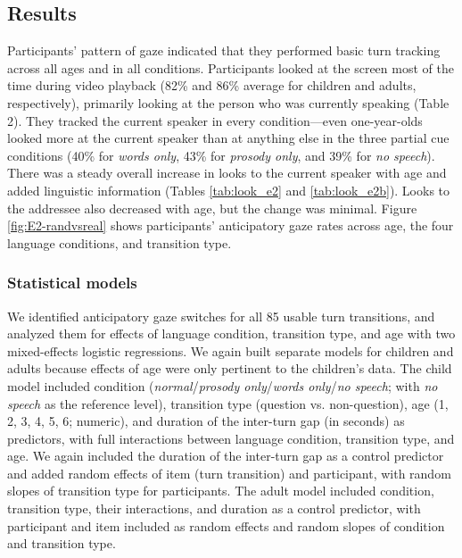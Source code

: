 \documentclass[authoryear, 12pt]{elsarticle}
\begin{document}
\subsection{Results}
\label{sec:results2}

Participants' pattern of gaze indicated that they performed basic turn tracking across all ages and in all conditions. Participants looked at the screen most of the time during video playback (82\% and 86\% average for children and adults, respectively), primarily looking at the person who was currently speaking (Table 2). They tracked the current speaker in every condition---even one-year-olds looked more at the current speaker than at anything else in the three partial cue conditions (40\% for \textit{words only}, 43\% for \textit{prosody only}, and 39\% for \textit{no speech}). There was a steady overall increase in looks to the current speaker with age and added linguistic information (Tables \ref{tab:look_e2} and \ref{tab:look_e2b}). Looks to the addressee also decreased with age, but the change was minimal. Figure \ref{fig:E2-randvsreal} shows participants' anticipatory gaze rates across age, the four language conditions, and transition type.

\subsubsection{Statistical models}
\label{sec:models2}

We identified anticipatory gaze switches for all 85 usable turn transitions, and analyzed them for effects of language condition, transition type, and age with two mixed-effects logistic regressions. We again built separate models for children and adults because effects of age were only pertinent to the children's data. The child model included condition (\textit{normal}/\textit{prosody only}/\textit{words only}/\textit{no speech}; with \textit{no speech} as the reference level), transition type (question vs. non-question), age (1, 2, 3, 4, 5, 6; numeric), and duration of the inter-turn gap (in seconds) as predictors, with full interactions between language condition, transition type, and age.  We again included the duration of the inter-turn gap as a control predictor and added random effects of item (turn transition) and participant, with random slopes of transition type for participants. The adult model included condition, transition type, their interactions, and duration as a control predictor, with participant and item included as random effects and random slopes of condition and transition type.
\end{document}
